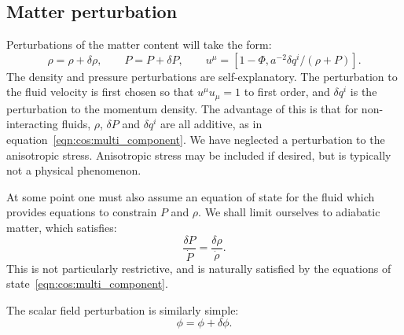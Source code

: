 \subsection{Matter perturbation}
Perturbations of the matter content will take the form:
\begin{equation}
  \rho = \rho + \delta \rho, \qquad 
  P = P + \delta P, \qquad
  u^\mu = \left[ 1-\Phi, a^{-2} \delta q^i/(\rho+P)\right].
\end{equation}
The density and pressure perturbations are self-explanatory. The perturbation to the fluid velocity is first chosen so that $u^\mu u_\mu=1$ to first order, and $\delta q^i$ is the perturbation to the momentum density. The advantage of this is that for non-interacting fluids, \delta $\rho$, $\delta P$ and $\delta q^i$ are all additive, as in equation~\eqref{eqn:cos:multi_component}. We have neglected a perturbation to the anisotropic stress. Anisotropic stress may be included if desired, but is typically not a physical phenomenon. 

At some point one must also assume an equation of state for the fluid which provides equations to constrain $P$ and $\rho$. We shall limit ourselves to adiabatic matter, which satisfies:
\begin{equation}
  \frac{\delta P}{\dot{P}} = \frac{\delta\rho}{\dot{\rho}}.
  \label{eqn:cos:adiabatic}
\end{equation}
This is not particularly restrictive, and is naturally satisfied by the equations of state~\eqref{eqn:cos:multi_component}.

The scalar field perturbation is similarly simple:
\begin{equation}
  \phi = \phi + \delta\phi.
\end{equation}

